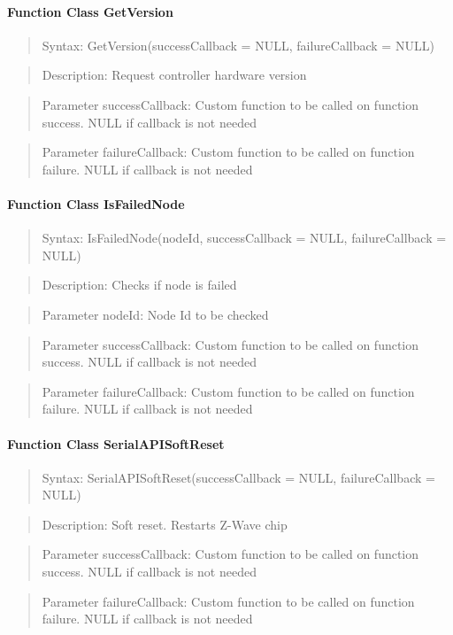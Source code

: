 \paragraph {Function Class GetVersion}
\begin{quote} Syntax: GetVersion(successCallback = NULL, failureCallback = NULL)\end{quote}
\begin{quote} Description: Request controller hardware version\end{quote}
\begin{quote} Parameter successCallback: Custom function to be called on function success. NULL if callback is not needed\end{quote} 
\begin{quote} Parameter failureCallback: Custom function to be called on function failure. NULL if callback is not needed\end{quote} 

\paragraph {Function Class IsFailedNode}
\begin{quote} Syntax: IsFailedNode(nodeId, successCallback = NULL, failureCallback = NULL)\end{quote}
\begin{quote} Description: Checks if node is failed\end{quote}
\begin{quote} Parameter nodeId: Node Id to be checked\end{quote}
\begin{quote} Parameter successCallback: Custom function to be called on function success. NULL if callback is not needed\end{quote} 
\begin{quote} Parameter failureCallback: Custom function to be called on function failure. NULL if callback is not needed\end{quote} 

\paragraph {Function Class SerialAPISoftReset}
\begin{quote} Syntax: SerialAPISoftReset(successCallback = NULL, failureCallback = NULL)\end{quote}
\begin{quote} Description: Soft reset. Restarts Z-Wave chip\end{quote}
\begin{quote} Parameter successCallback: Custom function to be called on function success. NULL if callback is not needed\end{quote} 
\begin{quote} Parameter failureCallback: Custom function to be called on function failure. NULL if callback is not needed\end{quote} 

